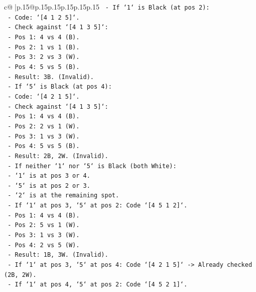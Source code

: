 \documentclass{article}
\begin{document}
{\begin{supertabular}{c@{$\;$}|p{.15\linewidth}@{}p{.15\linewidth}p{.15\linewidth}p{.15\linewidth}p{.15\linewidth}p{.15\linewidth}}
{{{\texttt{    {-} If `1` is Black (at pos 2):} \\
\texttt{        {-} Code: `{[}4 1 2 5{]}`.} \\
\texttt{        {-} Check against `{[}4 1 3 5{]}`:} \\
\texttt{            {-} Pos 1: 4 vs 4 (B).} \\
\texttt{            {-} Pos 2: 1 vs 1 (B).} \\
\texttt{            {-} Pos 3: 2 vs 3 (W).} \\
\texttt{            {-} Pos 4: 5 vs 5 (B).} \\
\texttt{            {-} Result: 3B. (Invalid).} \\
\texttt{    {-} If `5` is Black (at pos 4):} \\
\texttt{        {-} Code: `{[}4 2 1 5{]}`.} \\
\texttt{        {-} Check against `{[}4 1 3 5{]}`:} \\
\texttt{            {-} Pos 1: 4 vs 4 (B).} \\
\texttt{            {-} Pos 2: 2 vs 1 (W).} \\
\texttt{            {-} Pos 3: 1 vs 3 (W).} \\
\texttt{            {-} Pos 4: 5 vs 5 (B).} \\
\texttt{            {-} Result: 2B, 2W. (Invalid).} \\
\texttt{    {-} If neither `1` nor `5` is Black (both White):} \\
\texttt{        {-} `1` is at pos 3 or 4.} \\
\texttt{        {-} `5` is at pos 2 or 3.} \\
\texttt{        {-} `2` is at the remaining spot.} \\
\texttt{        {-} If `1` at pos 3, `5` at pos 2: Code `{[}4 5 1 2{]}`.} \\
\texttt{            {-} Pos 1: 4 vs 4 (B).} \\
\texttt{            {-} Pos 2: 5 vs 1 (W).} \\
\texttt{            {-} Pos 3: 1 vs 3 (W).} \\
\texttt{            {-} Pos 4: 2 vs 5 (W).} \\
\texttt{            {-} Result: 1B, 3W. (Invalid).} \\
\texttt{        {-} If `1` at pos 3, `5` at pos 4: Code `{[}4 2 1 5{]}` {-}> Already checked (2B, 2W).} \\
\texttt{        {-} If `1` at pos 4, `5` at pos 2: Code `{[}4 5 2 1{]}`.} \\
}}}
\end{supertabular}}
\end{document}
